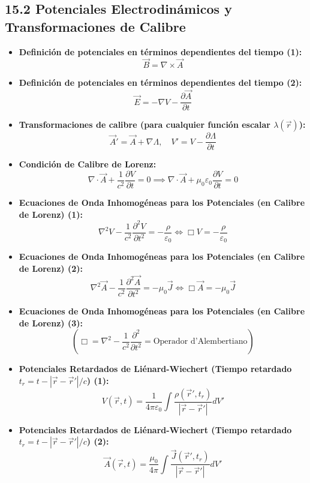 \documentclass[11pt,a4paper]{article}
\begin{document}
\subsection*{15.2 Potenciales Electrodinámicos y Transformaciones de Calibre}

\begin{itemize}
  \item \textbf{Definición de potenciales en términos dependientes del tiempo (1):}
  \[
    \vec{B} = \nabla \times \vec{A}
  \]
  \item \textbf{Definición de potenciales en términos dependientes del tiempo (2):}
  \[
    \vec{E} = -\nabla V - \frac{\partial \vec{A}}{\partial t}
  \]
  \item \textbf{Transformaciones de calibre (para cualquier función escalar $\lambda(\vec{r})$):}
  \[
    \vec{A}' = \vec{A} + \nabla \Lambda, \quad V' = V - \frac{\partial \Lambda}{\partial t}
  \]
  \item \textbf{Condición de Calibre de Lorenz:}
  \[
    \nabla \cdot \vec{A} + \frac{1}{c^2} \frac{\partial V}{\partial t} = 0 \implies \nabla \cdot \vec{A} + \mu_0 \varepsilon_0 \frac{\partial V}{\partial t} = 0
  \]
  \item \textbf{Ecuaciones de Onda Inhomogéneas para los Potenciales (en Calibre de Lorenz) (1):}
  \[
    \nabla^2 V - \frac{1}{c^2} \frac{\partial^2 V}{\partial t^2} = -\frac{\rho}{\varepsilon_0} \iff \Box V = -\frac{\rho}{\varepsilon_0}
  \]
  \item \textbf{Ecuaciones de Onda Inhomogéneas para los Potenciales (en Calibre de Lorenz) (2):}
  \[
    \nabla^2 \vec{A} - \frac{1}{c^2} \frac{\partial^2 \vec{A}}{\partial t^2} = -\mu_0 \vec{J} \iff \Box \vec{A} = -\mu_0 \vec{J}
  \]
  \item \textbf{Ecuaciones de Onda Inhomogéneas para los Potenciales (en Calibre de Lorenz) (3):}
  \[
    (\Box = \nabla^2 - \frac{1}{c^2}\frac{\partial^2}{\partial t^2} = \text{Operador d'Alembertiano})
  \]
  \item \textbf{Potenciales Retardados de Liénard-Wiechert (Tiempo retardado $t_r = t - |\vec{r} - \vec{r}'|/c$) (1):}
  \[
    V(\vec{r}, t) = \frac{1}{4\pi\varepsilon_0} \int \frac{\rho(\vec{r}', t_r)}{|\vec{r} - \vec{r}'|} dV'
  \]
  \item \textbf{Potenciales Retardados de Liénard-Wiechert (Tiempo retardado $t_r = t - |\vec{r} - \vec{r}'|/c$) (2):}
  \[
    \vec{A}(\vec{r}, t) = \frac{\mu_0}{4\pi} \int \frac{\vec{J}(\vec{r}', t_r)}{|\vec{r} - \vec{r}'|} dV'
  \]
\end{itemize}
\end{document}

